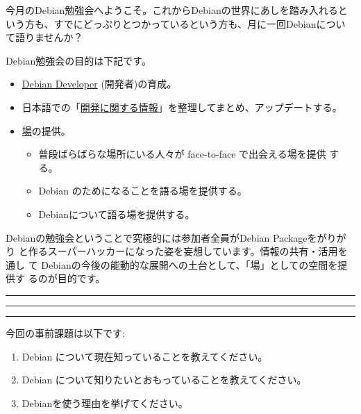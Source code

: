 \documentclass[mingoth,a4paper]{jsarticle}
\begin{document}
\begin{multicols}{2}
 
 
 今月のDebian勉強会へようこそ。これからDebianの世界にあしを踏み入れると
 いう方も、すでにどっぷりとつかっているという方も、月に一回Debianについ
 て語りませんか？

 Debian勉強会の目的は下記です。

 \begin{itemize}
 \item \underline{Debian Developer} (開発者)の育成。
 \item 日本語での「\underline{開発に関する情報}」を整理してまとめ、アップデートする。
 \item \underline{場}の提供。
 \begin{itemize}
  \item 普段ばらばらな場所にいる人々が face-to-face で出会える場を提供
	する。
  \item Debian のためになることを語る場を提供する。
  \item Debianについて語る場を提供する。
 \end{itemize}
 \end{itemize}		

 Debianの勉強会ということで究極的には参加者全員がDebian Packageをがりがり
 と作るスーパーハッカーになった姿を妄想しています。情報の共有・活用を通し
 て Debianの今後の能動的な展開への土台として、「場」としての空間を提供す
 るのが目的です。

\end{multicols}

\newpage

\begin{minipage}[b]{0.2\hsize}
 \colorbox{titleback}{}
\end{minipage}
\begin{minipage}[b]{0.8\hsize}
\hrule
\vspace{2mm}
\hrule
\tableofcontents
\vspace{2mm}
\hrule
\end{minipage}


今回の事前課題は以下です:

\begin{enumerate}
 \item Debian について現在知っていることを教えてください。
 \item Debian について知りたいとおもっていることを教えてください。
 \item Debianを使う理由を挙げてください。
\end{enumerate}
\end{document}
